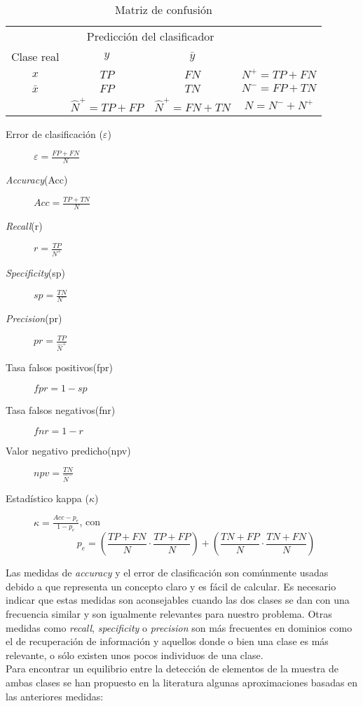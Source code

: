 \begin{table}[H]
\centering
\begin{tabular}{cccc}
\cline{1-3}
\multicolumn{1}{|c|}{}           & \multicolumn{2}{c|}{Predicción del clasificador}      &                 \\ \cline{1-3}
\multicolumn{1}{|c|}{Clase real} & \multicolumn{1}{c|}{$y$}    & \multicolumn{1}{c|}{$\bar{y}$}    &                 \\ \cline{1-3}
\multicolumn{1}{|c|}{$x$}          & \multicolumn{1}{c|}{$TP$} & \multicolumn{1}{c|}{$FN$} & $N^+ = TP + FN$ \\ \cline{1-3}
\multicolumn{1}{|c|}{$\bar{x}$}          & \multicolumn{1}{c|}{$FP$} & \multicolumn{1}{c|}{$TN$} & $N^- = FP + TN$ \\ \cline{1-3}
                                & $\hat{N}^+ = TP + FP$     & $\hat{N}^+ = FN + TN$     &   $N = N^- + N^+$             
\end{tabular}
\caption{Matriz de confusión}
\label{tab:matrizconfusion}
\end{table} 
	
\begin{description}
	\item[Error de clasificación ($\varepsilon$)] $\varepsilon = \frac{FP+FN}{N}$
	\item[\textit{Accuracy}(Acc)] $Acc=\frac{TP+TN}{N}$
	\item[\textit{Recall}(r)] $r=\frac{TP}{N^+}$
	\item[\textit{Specificity}(sp)] $sp=\frac{TN}{N^-}$
	\item[\textit{Precision}(pr)] $pr=\frac{TP}{\hat{N}^+}$
	\item[Tasa falsos positivos(fpr)] $fpr=1-sp$
	\item[Tasa falsos negativos(fnr)] $fnr=1-r$
	\item[Valor negativo predicho(npv)] $npv=\frac{TN}{\hat{N}^-}$
	\item[Estadístico kappa ($\kappa$)] $\kappa = \frac{Acc-p_e}{1-p_e}$, con 
	\[ p_e = 
		\left( \frac{TP+FN}{N} \cdot \frac{TP+FP}{N} \right) + 
		\left( \frac{TN+FP}{N} \cdot \frac{TN+FN}{N} \right)  \] 
\end{description}
	
	Las medidas de \textit{accuracy} y el error de clasificación son comúnmente usadas debido a que representa un concepto claro y es fácil de calcular.  Es necesario indicar que estas medidas son aconsejables cuando las dos clases se dan con una frecuencia similar y son igualmente relevantes para nuestro problema. Otras medidas como \textit{recall}, \textit{specificity} o \textit{precision} son más frecuentes en dominios como el de recuperación de información y aquellos donde o bien una clase es más relevante, o sólo existen unos pocos individuos de una clase.\\
	Para encontrar un equilibrio entre la detección de elementos de la muestra de ambas clases se han propuesto en la literatura algunas aproximaciones basadas en las anteriores medidas:
	
